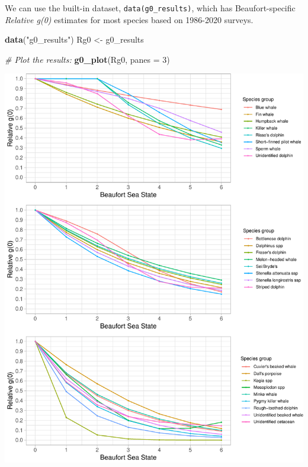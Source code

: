 \documentclass[
]{book}
\newenvironment{Shaded}{\begin{snugshade}}{\end{snugshade}}
\newcommand{\CommentTok}[1]{\textcolor[rgb]{0.56,0.35,0.01}{\textit{#1}}}
\newcommand{\DataTypeTok}[1]{\textcolor[rgb]{0.13,0.29,0.53}{#1}}
\newcommand{\DecValTok}[1]{\textcolor[rgb]{0.00,0.00,0.81}{#1}}
\newcommand{\KeywordTok}[1]{\textcolor[rgb]{0.13,0.29,0.53}{\textbf{#1}}}
\newcommand{\NormalTok}[1]{#1}
\newcommand{\StringTok}[1]{\textcolor[rgb]{0.31,0.60,0.02}{#1}}
\begin{document}
We can use the built-in dataset, \texttt{data(g0\_results)}, which has Beaufort-specific \emph{Relative g(0)} estimates for most species based on 1986-2020 surveys.

\begin{Shaded}
\begin{Highlighting}[]
\KeywordTok{data}\NormalTok{(}\StringTok{"g0_results"}\NormalTok{)}
\NormalTok{Rg0 <-}\StringTok{ }\NormalTok{g0_results}
\end{Highlighting}
\end{Shaded}

\begin{Shaded}
\begin{Highlighting}[]
\CommentTok{# Plot the results: }
\KeywordTok{g0_plot}\NormalTok{(Rg0, }\DataTypeTok{panes =} \DecValTok{3}\NormalTok{)}
\end{Highlighting}
\end{Shaded}

\includegraphics{figures/unnamed-chunk-274-1.pdf}
\end{document}
